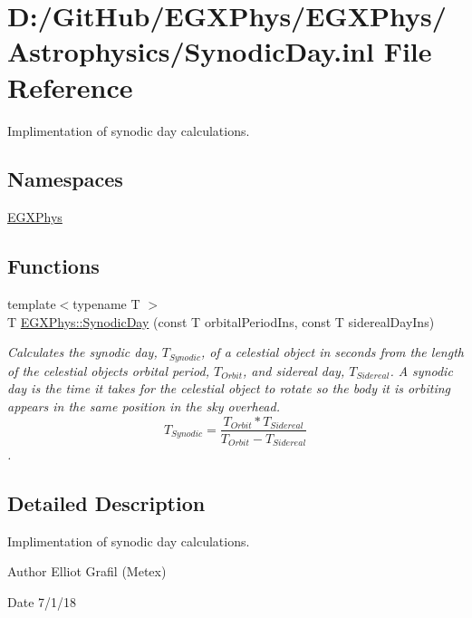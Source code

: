 \hypertarget{_synodic_day_8inl}{}\section{D\+:/\+Git\+Hub/\+E\+G\+X\+Phys/\+E\+G\+X\+Phys/\+Astrophysics/\+Synodic\+Day.inl File Reference}
\label{_synodic_day_8inl}


Implimentation of synodic day calculations.  


\subsection*{Namespaces}
\begin{DoxyCompactItemize}
\item 
 \mbox{\hyperlink{namespace_e_g_x_phys}{E\+G\+X\+Phys}}
\end{DoxyCompactItemize}
\subsection*{Functions}
\begin{DoxyCompactItemize}
\item 
{\footnotesize template$<$typename T $>$ }\\T \mbox{\hyperlink{group___e_g_x_phys-_astrophysic-_synodic_day_ga637140842bc008c87d90e65b551cbac7}{E\+G\+X\+Phys\+::\+Synodic\+Day}} (const T orbital\+Period\+Ins, const T sidereal\+Day\+Ins)
\begin{DoxyCompactList}\small\item\em Calculates the synodic day, $T_{Synodic}$, of a celestial object in seconds from the length of the celestial object\textquotesingle{}s orbital period, $T_{Orbit}$, and sidereal day, $T_{Sidereal}$. A synodic day is the time it takes for the celestial object to rotate so the body it is orbiting appears in the same position in the sky overhead. \[ T_{Synodic}=\dfrac{T_{Orbit} * T_{Sidereal}}{T_{Orbit} - T_{Sidereal}}\]. \end{DoxyCompactList}\end{DoxyCompactItemize}


\subsection{Detailed Description}
Implimentation of synodic day calculations. 

\begin{DoxyAuthor}{Author}
Elliot Grafil (Metex) 
\end{DoxyAuthor}
\begin{DoxyDate}{Date}
7/1/18 
\end{DoxyDate}
